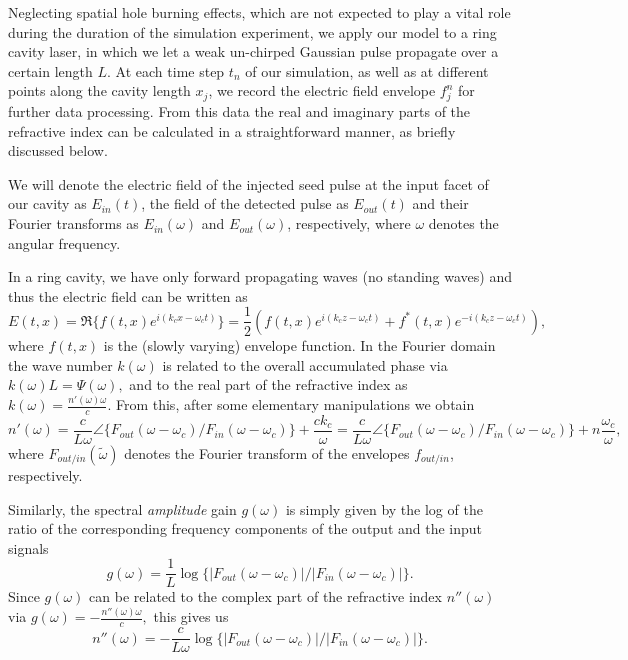 \documentclass[10pt,letterpaper]{article}
\begin{document}
{Neglecting spatial hole burning effects, which are not expected to play a vital role during the duration of the simulation experiment, we apply our model to a ring cavity laser, in which we let a weak un-chirped Gaussian pulse propagate over a certain length $L$. At each time step $t_n$ of our simulation, as well as at different points along the cavity length $x_j$, we record the electric field envelope $f_j^{n}$ for further data processing. From this data the real and imaginary parts of the refractive index can be calculated in a straightforward manner, as briefly discussed below. 

We will denote the electric field of the injected seed pulse at the input facet of our cavity as $E_{in}(t)$, the field of the detected pulse as $E_{out}(t)$ and their Fourier transforms as $E_{in}(\omega)$ and $E_{out}(\omega)$, respectively, where $\omega$ denotes the angular frequency.

In a ring cavity, we have only forward propagating waves (no standing waves) and thus the electric field can be written as
\begin{equation}
E(t,x) = \Re\{f(t,x)e^{i (k_c x - \omega_c t) }\} = \frac{1}{2} \left ( f(t,x)e^{i (k_c z - \omega_c t)} +f^*(t,x) e^{-i (k_c z - \omega_c t) }\right) ,
\end{equation}
where $f(t,x)$ is the (slowly varying) envelope function. In the Fourier domain the wave number  $k(\omega)$ is related to the overall accumulated phase via $k(\omega)L = \Psi(\omega),$ and to the real part of the refractive index as 
$k(\omega) =  \frac{n'(\omega)\omega}{c}.$ From this, after some elementary manipulations we obtain 
\begin{equation}
n'(\omega) = \frac{c}{L \omega }\angle\{F_{out}(\omega-\omega_c)/F_{in}(\omega-\omega_c)\}+\frac{ck_c}{\omega} = \frac{c}{L\omega }\angle\{F_{out}(\omega-\omega_c)/F_{in}(\omega-\omega_c)\}+n\frac{\omega_c}{\omega},
\end{equation}
where $F_{out/in}(\tilde\omega)$ denotes the Fourier transform of the envelopes $f_{out/in}$, respectively. 

Similarly, the spectral \emph{amplitude} gain $g(\omega)$ is simply given by the log of the ratio of the corresponding frequency components of the output and the input signals
\begin{equation}
\label{eq:gaineq}
g(\omega) = \frac{1}{L} \log\{|F_{out}(\omega-\omega_c)|/|F_{in}(\omega-\omega_c)|\}.
\end{equation}
Since $g(\omega)$ can be related to the complex part of the refractive index $n''(\omega)$ via
$
g(\omega) = -\frac{n''(\omega)\omega}{c}, 
$
this gives us
\begin{equation}
n''(\omega) = -\frac{c}{L\omega}\log\{|F_{out}(\omega-\omega_c)|/|F_{in}(\omega-\omega_c)|\}.
\end{equation}

}
\end{document}
